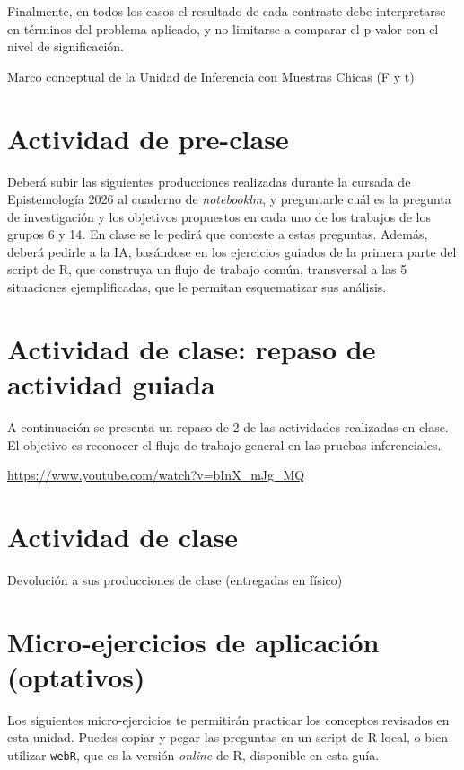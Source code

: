 \documentclass[
  spanish,
  letterpaper,
  DIV=11,
  numbers=noendperiod]{scrreprt}
\begin{document}
Finalmente, en todos los casos el resultado de cada contraste debe
interpretarse en términos del problema aplicado, y no limitarse a
comparar el p-valor con el nivel de significación.

Marco conceptual de la Unidad de Inferencia con Muestras Chicas (F y t)

\section{\texorpdfstring{\textbf{Actividad de
pre-clase}}{Actividad de pre-clase}}\label{actividad-de-pre-clase-4}

Deberá subir las siguientes producciones realizadas durante la cursada
de Epistemología 2026 al cuaderno de \emph{notebooklm}, y preguntarle
cuál es la pregunta de investigación y los objetivos propuestos en cada
uno de los trabajos de los grupos 6 y 14. En clase se le pedirá que
conteste a estas preguntas. Además, deberá pedirle a la IA, basándose en
los ejercicios guiados de la primera parte del script de R, que
construya un flujo de trabajo común, transversal a las 5 situaciones
ejemplificadas, que le permitan esquematizar sus análisis.

\section{Actividad de clase: repaso de actividad
guiada}\label{actividad-de-clase-repaso-de-actividad-guiada}

A continuación se presenta un repaso de 2 de las actividades realizadas
en clase. El objetivo es reconocer el flujo de trabajo general en las
pruebas inferenciales.

\url{https://www.youtube.com/watch?v=bInX_mJg_MQ}

\section{\texorpdfstring{\textbf{Actividad de
clase}}{Actividad de clase}}\label{actividad-de-clase-2}

Devolución a sus producciones de clase (entregadas en físico)

\section{Micro-ejercicios de aplicación
(optativos)}\label{micro-ejercicios-de-aplicaciuxf3n-optativos-7}

Los siguientes micro-ejercicios te permitirán practicar los conceptos
revisados en esta unidad. Puedes copiar y pegar las preguntas en un
script de R local, o bien utilizar \texttt{webR}, que es la versión
\emph{online} de R, disponible en esta guía.
\end{document}
